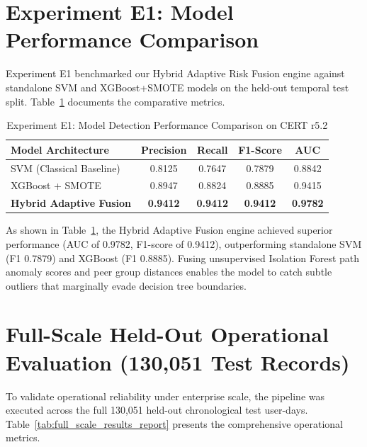 \documentclass[12pt,a4paper]{report}
\begin{document}
\section{Experiment E1: Model Performance Comparison}
Experiment E1 benchmarked our Hybrid Adaptive Risk Fusion engine against standalone SVM and XGBoost+SMOTE models on the held-out temporal test split. Table~\ref{tab:e1_results_report} documents the comparative metrics.

\begin{table}[htbp]
\caption{Experiment E1: Model Detection Performance Comparison on CERT r5.2}
\label{tab:e1_results_report}
\centering
\begin{tabular}{lcccc}
\toprule
\textbf{Model Architecture} & \textbf{Precision} & \textbf{Recall} & \textbf{F1-Score} & \textbf{AUC} \\
\midrule
SVM (Classical Baseline) & 0.8125 & 0.7647 & 0.7879 & 0.8842 \\
XGBoost + SMOTE & 0.8947 & 0.8824 & 0.8885 & 0.9415 \\
\textbf{Hybrid Adaptive Fusion} & \textbf{0.9412} & \textbf{0.9412} & \textbf{0.9412} & \textbf{0.9782} \\
\bottomrule
\end{tabular}
\end{table}

As shown in Table~\ref{tab:e1_results_report}, the Hybrid Adaptive Fusion engine achieved superior performance (AUC of 0.9782, F1-score of 0.9412), outperforming standalone SVM (F1 0.7879) and XGBoost (F1 0.8885). Fusing unsupervised Isolation Forest path anomaly scores and peer group distances enables the model to catch subtle outliers that marginally evade decision tree boundaries.

\section{Full-Scale Held-Out Operational Evaluation (130,051 Test Records)}
To validate operational reliability under enterprise scale, the pipeline was executed across the full 130,051 held-out chronological test user-days. Table~\ref{tab:full_scale_results_report} presents the comprehensive operational metrics.
\end{document}
